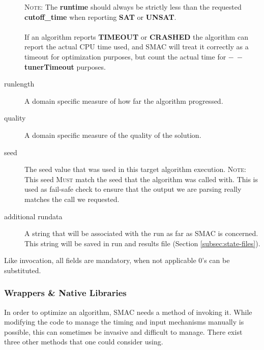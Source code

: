 \documentclass[manual.tex]{subfiles}
\begin{document}
\begin{description}
\textsc{Note: }The \textbf{runtime }should always be strictly less
than the requested \textbf{cutoff\_time } when reporting \textbf{SAT
}or \textbf{UNSAT}. 
\\
\\
If an algorithm reports \textbf{TIMEOUT} or \textbf{CRASHED} the algorithm can report the actual CPU time used, and SMAC will treat it correctly as a timeout for optimization purposes, but count the actual time for \textbf{$-\!~-$tunerTimeout} purposes.

\item [{runlength}] A domain specific measure of how far the algorithm
progressed.
\item [{quality}] A domain specific measure of the quality of the solution.
\item [{seed}] The seed value that was used in this target algorithm execution.
\textsc{Note:} This seed \textsc{Must} match the seed that the algorithm was
called with. This is used as fail-safe check to ensure that the output
we are parsing really matches the call we requested.
\item[{additional rundata}] A string that will be associated with the run as far as SMAC is concerned. This string will be saved in run and results file (Section \ref{subsec:state-files}).

\end{description}
Like invocation, all fields are mandatory, when not applicable 0's
can be substituted. 

\subsubsection{Wrappers \& Native Libraries}
\label{sec:exec-options}
In order to optimize an algorithm, SMAC needs a method of invoking it. While modifying the code
to manage the timing and input mechanisms manually is possible, this can sometimes be invasive and difficult to manage. There exist three other methods that one could consider using.
\end{document}
